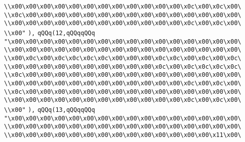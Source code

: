 \verb|\\x00\x00\x00\x00\x00\x00\x00\x00\x00\x00\x00\x00\x0c\x00\x0c\x00\|\newline
\verb|\\x0c\x00\x00\x00\x00\x00\x00\x00\x00\x00\x00\x00\x00\x00\x00\x00\|\newline
\verb|\\x00\x00\x00\x00\x00\x00\x00\x00\x00\x00\x00\x00\x0c\x00\x0c\x00\|\newline
\verb|\\x00"|\newline
\verb|),|\newline
\verb|qQQq(12,qQQqqQQq|\newline
\verb|"\x00\x00\x00\x00\x00\x00\x00\x00\x00\x00\x00\x00\x00\x00\x00\x00\|\newline
\verb|\\x00\x00\x00\x00\x00\x00\x00\x00\x00\x00\x00\x00\x00\x00\x00\x00\|\newline
\verb|\\x00\x0c\x00\x0c\x0c\x0c\x0c\x00\x00\x00\x0c\x0c\x00\x0c\x00\x0c\|\newline
\verb|\\x00\x00\x00\x00\x00\x00\x00\x00\x00\x00\x0c\x00\x0c\x0c\x0c\x0c\|\newline
\verb|\\x0c\x00\x00\x00\x00\x00\x00\x00\x00\x00\x00\x00\x00\x00\x00\x00\|\newline
\verb|\\x00\x00\x00\x00\x00\x00\x00\x00\x00\x00\x00\x00\x0c\x00\x0c\x00\|\newline
\verb|\\x0c\x00\x00\x00\x00\x00\x00\x00\x00\x00\x00\x00\x00\x00\x00\x00\|\newline
\verb|\\x00\x00\x00\x00\x00\x00\x00\x00\x00\x00\x00\x00\x0c\x00\x0c\x00\|\newline
\verb|\\x00"|\newline
\verb|),|\newline
\verb|qQQq(13,qQQqqQQq|\newline
\verb|"\x00\x00\x00\x00\x00\x00\x00\x00\x00\x00\x00\x00\x00\x00\x00\x00\|\newline
\verb|\\x00\x00\x00\x00\x00\x00\x00\x00\x00\x00\x00\x00\x00\x00\x00\x00\|\newline
\verb|\\x00\x00\x00\x00\x00\x00\x00\x00\x00\x00\x00\x00\x00\x00\x11\x00\|\newline
